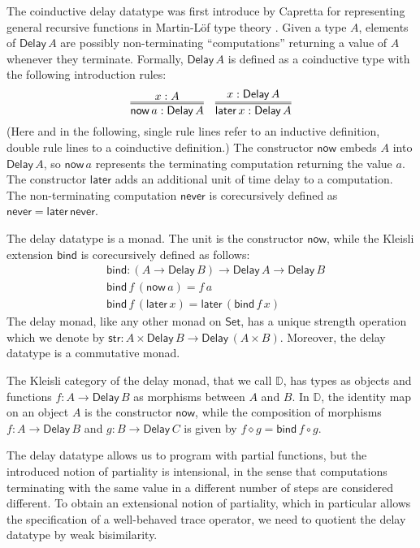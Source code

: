 \documentclass[runningheads]{llncs}
\newcommand{\Set}{\mathsf{Set}}
\newcommand{\comp}{\circ}
\newcommand{\Delay}{\mathsf{Delay}\,}
\newcommand{\now}{\mathsf{now}}
\newcommand{\later}{\mathsf{later}}
\newcommand{\never}{\mathsf{never}}
\newcommand{\bind}{\mathsf{bind}}
\newcommand{\str}{\mathsf{str}}
\newcommand{\D}{\mathbb{D}}
\begin{document}
The coinductive delay datatype was first introduce by Capretta for
representing general recursive functions in Martin-L\"of type theory
\cite{Capretta05}.  Given a type $A$, elements of $\Delay A$ are
possibly non-terminating ``computations'' returning a value of $A$
whenever they terminate. Formally, $\Delay A$ is defined as a
coinductive type with the following introduction rules:
\[
\infer={\now\,a : \Delay A}{x : A}
\quad
\infer={\later\,x : \Delay A}{x : \Delay A}
\]
(Here and in the following, single rule lines refer to an inductive
definition, double rule lines to a coinductive definition.) The
constructor $\now$ embeds $A$ into $\Delay A$, so $\now\,a$ represents
the terminating computation returning the value $a$. The constructor
$\later$ adds an additional unit of time delay to a computation. The
non-terminating computation $\never$ is corecursively defined as
$\never = \later \,\never$.

The delay datatype is a monad. The unit is the constructor $\now$,
while the Kleisli extension $\bind$ is corecursively defined as follows:
\begin{align*}
& \bind : (A \to \Delay B) \to \Delay A \to \Delay B \\
& \bind \,f \, (\now\,a) = f\,a \\
& \bind\,f\,(\later\,x) = \later\,(\bind\,f\,x)
\end{align*}
The delay monad, like any other monad on $\Set$, has a unique strength
operation which we denote by $\str : A \times \Delay B \to \Delay (A
\times B)$. Moreover, the delay datatype is a commutative monad.

The Kleisli category of the delay monad, that we call $\D$, has types
as objects and functions $f : A \to \Delay B$ as morphisms between $A$
and $B$. In $\D$, the identity map on an object $A$ is the constructor
$\now$, while the composition of morphisms $f : A \to \Delay B$ and $g
: B \to \Delay C$ is given by $f \diamond g = \bind\,f \comp g$.

The delay datatype allows us to program with partial functions, but
the introduced notion of partiality is intensional, in the sense that
computations terminating with the same value in a different number of
steps are considered different. To obtain an extensional notion of
partiality, which in particular allows the specification of a
well-behaved trace operator, we need to quotient the delay datatype by
weak bisimilarity.
\end{document}
